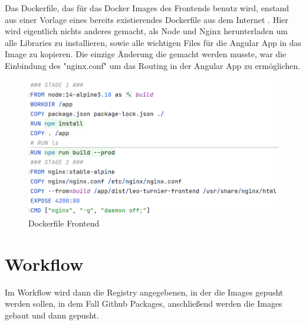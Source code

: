 Das Dockerfile, das für das Docker Images des Frontends benutz wird, enstand aus einer Vorlage eines bereits existierendes Dockerfile aus dem Internet \cite{deployment-dockerfile-1}.
Hier wird eigentlich nichts anderes gemacht, als Node und Nginx herunterladen um alle Libraries zu installieren, sowie alle wichtigen Files für die Angular App in das Image zu kopieren.
Die einzige Änderung die gemacht werden musste, war die Einbindung des "nginx.conf" um das Routing in der Angular App zu ermöglichen.

\begin{figure}[H]
    \includegraphics[scale=0.44]{pics/docker/dockerfile_frontend.png}
    \caption{Dockerfile Frontend}
\end{figure}

\section{Workflow}

Im Workflow wird dann die Registry angegebenen, in der die Images gepusht werden sollen, in dem Fall Github Packages, anschließend werden die Images gebaut und dann gepusht.


